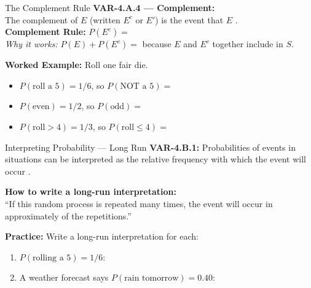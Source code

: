 \documentclass[10pt]{article}
\begin{document}
\begin{notesbox}{The Complement Rule}
\small
\textbf{VAR-4.A.4 --- Complement:}\\
The complement of $E$ (written $E^c$ or $E'$) is the event that $E$ .\\[6pt]
\textbf{Complement Rule:} $P(E^c) = $ \\[6pt]
\textit{Why it works:} $P(E) + P(E^c) = $  because $E$ and $E^c$ together
include  in $S$.

\vspace{10pt}
\textbf{Worked Example:} Roll one fair die.
\begin{itemize}[itemsep=4pt]
  \item $P(\text{roll a 5}) = 1/6$, so $P(\text{NOT a 5}) = $ 
  \item $P(\text{even}) = 1/2$, so $P(\text{odd}) = $ 
  \item $P(\text{roll} > 4) = 1/3$, so $P(\text{roll} \le 4) = $ 
\end{itemize}
\end{notesbox}

\vspace{0.1in}

\begin{notesbox}{Interpreting Probability --- Long Run}
\small
\textbf{VAR-4.B.1:} Probabilities of events in  situations can be
interpreted as the relative frequency with which the event will occur .

\vspace{8pt}
\textbf{How to write a long-run interpretation:}\\
``If this random process is repeated many times, the event  will occur in
approximately  of the repetitions.''

\vspace{10pt}
\textbf{Practice:} Write a long-run interpretation for each:
\begin{enumerate}[leftmargin=1.5em, itemsep=10pt]
  \item $P(\text{rolling a 5}) = 1/6$:\\
  \item A weather forecast says $P(\text{rain tomorrow}) = 0.40$:\\
\end{enumerate}
\end{notesbox}
\end{document}
